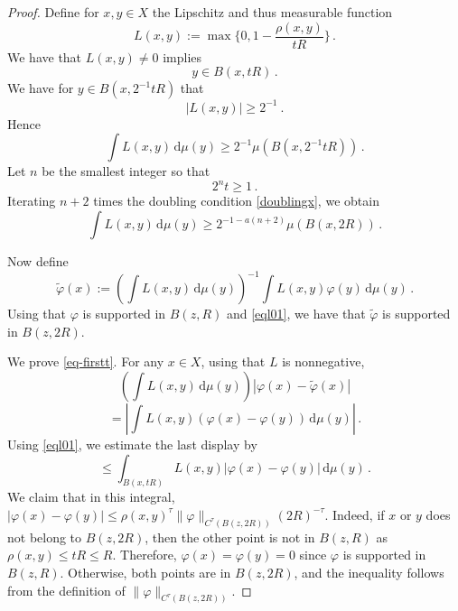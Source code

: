 \begin{proof}\leanok
    Define for $x,y\in X$ the Lipschitz and thus measurable function
    \begin{equation}
        L(x,y) := \max\{0, 1 - \frac{\rho(x,y)}{tR}\}\, .
    \end{equation}
We have that $L(x,y)\neq 0$ implies
\begin{equation}\label{eql01}
    y\in B(x, tR)\, .
\end{equation}
We have for $y\in B(x, 2^{-1}tR)$ that
\begin{equation}\label{eql30}
    |L(x,y)|\ge 2^{-1} \ .
\end{equation}
Hence
\begin{equation}
    \int L(x,y) \, \mathrm{d}\mu(y)\ge 2^{-1}\mu(B(x, 2^{-1}tR))\, .
\end{equation}
 Let $n$ be the smallest integer so that
 \begin{equation}\label{2nt1}
    2^n t\ge 1\, .
 \end{equation}
 Iterating $n+2$ times the doubling condition \eqref{doublingx}, we obtain
 \begin{equation}\label{eql32}
    \int L(x,y) \, \mathrm{d}\mu(y)\ge 2^{-1-a(n+2)}\mu(B(x, 2R))\, .
 \end{equation}

Now define
    $$
        \tilde \varphi(x) := \left(\int L(x,y) \, \mathrm{d}\mu(y)\right)^{-1}\int L(x,y) \varphi(y) \, \mathrm{d}\mu(y)\, .
    $$
Using that $\varphi$ is supported in $B(z,R)$ and
\eqref{eql01}, we have that $\tilde{\varphi}$ is supported in $B(z,2R)$.

We prove \eqref{eq-firstt}.
 For any $x\in X$, using that $L$ is nonnegative,
   \begin{equation}\label{eql1}
    \left(\int L(x,y) \, \mathrm{d}\mu(y)\right)
        |\varphi(x) - \tilde \varphi(x)|
    \end{equation}
 \begin{equation}\label{eql2}
 = \left| \int L(x,y)(\varphi(x) - \varphi(y)) \, \mathrm{d}\mu(y)\right|\, .
    \end{equation}
Using \eqref{eql01}, we estimate the last display by
 \begin{equation}\label{eql3}
         \le \int_{B(x, tR)} L(x,y)|\varphi(x) - \varphi(y)| \, \mathrm{d}\mu(y)\, .\end{equation}
We claim that in this integral, $|\varphi(x) - \varphi(y)|\le \rho(x,y)^\tau \|\varphi\|_{C^\tau(B(z, 2R))}(2R)^{-\tau}$.
Indeed, if $x$ or $y$ does not belong to $B(z, 2R)$, then the other point is not in $B(z,R)$ as $\rho(x,y)\le tR \le R$. Therefore,
$\varphi(x)=\varphi(y)=0$ since $\varphi$ is supported in $B (z, R)$. Otherwise, both points are in $B(z, 2R)$, and the inequality
follows from the definition of $\|\varphi\|_{C^\tau(B(z, 2R))}$.


\end{proof}
